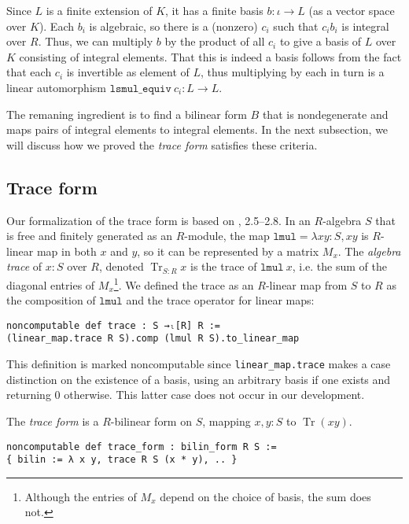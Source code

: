 \documentclass[a4paper,USenglish,cleveref, autoref, thm-restate]{lipics-v2021}
\newcommand{\lean}[1]{\texttt{#1}\xspace} %
\DeclareMathOperator{\Tr}{\mathrm{Tr}}
\begin{document}
Since $L$ is a finite extension of $K$, it has a finite basis $b : \iota \to L$ (as a vector space over $K$).
Each $b_i$ is algebraic, so there is a (nonzero) $c_i$ such that $c_i b_i$ is integral over $R$.
Thus, we can multiply $b$ by the product of all $c_i$ to give a basis of $L$ over $K$ consisting of integral elements.
That this is indeed a basis follows from the fact that each $c_i$ is invertible as element of $L$,
thus multiplying by each in turn is a linear automorphism $\lean{lsmul\_equiv}\ c_i : L \to L$.

The remaning ingredient is to find a bilinear form $B$ that is nondegenerate and maps pairs of integral elements to integral elements. In the next subsection, we will discuss how we proved the \emph{trace form} satisfies these criteria.

\subsection{Trace form}
Our formalization of the trace form is based on \cite{Neukirch}, 2.5--2.8.
In an $R$-algebra $S$ that is free and finitely generated as an $R$-module,
the map $\lean{lmul} = \lambda x y : S, xy$ is $R$-linear map in both $x$ and $y$, so it can be represented by a matrix $M_x$.
The \emph{algebra trace} of $x : S$ over $R$, denoted $\Tr_{S : R} x$ is the trace of $\lean{lmul}\ x$, i.e. the sum of the diagonal entries of $M_x$\footnote{Although the entries of $M_x$ depend on the choice of basis, the sum does not.}.
We defined the trace as an $R$-linear map from $S$ to $R$ as the composition of $\lean{lmul}$ and the trace operator for linear maps:
\begin{lstlisting}
noncomputable def trace : S →ₗ[R] R :=
(linear_map.trace R S).comp (lmul R S).to_linear_map
\end{lstlisting}
This definition is marked noncomputable since \lean{linear\_map.trace} makes a case distinction on the existence of a basis,
using an arbitrary basis if one exists and returning $0$ otherwise.
This latter case does not occur in our development.

The \emph{trace form} is a $R$-bilinear form on $S$, mapping $x, y : S$ to $\Tr(xy)$.
\begin{lstlisting}
noncomputable def trace_form : bilin_form R S :=
{ bilin := λ x y, trace R S (x * y), .. }
\end{lstlisting}
\end{document}
